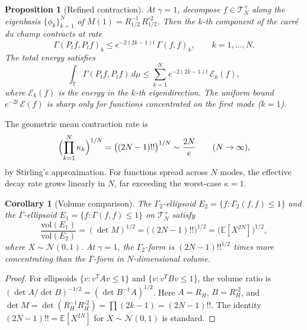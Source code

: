 \documentclass[11pt,a4paper]{article}
\theoremstyle{plain}
\newtheorem{proposition}[theorem]{Proposition}
\newtheorem{corollary}[theorem]{Corollary}
\theoremstyle{definition}
\theoremstyle{remark}
\newcommand{\E}{\mathbb{E}}
\newcommand{\T}{\mathbb{T}}
\begin{document}
\begin{proposition}[Refined contraction]\label{prop:refined}
At $\gamma = 1$, decompose $f \in \mathcal{T}_N^+$ along the
eigenbasis $\{\phi_k\}_{k=1}^N$ of $M(1) = R_{1/2}^{-1}\,R_{1/2}^{\circ 2}$.
Then the $k$-th component of the carr\'e du champ contracts at rate
\begin{equation}\label{eq:refined-contraction}
  \Gamma(P_t f, P_t f)_k \leq e^{-2(2k-1)t}\,\Gamma(f,f)_k,
  \qquad k = 1,\ldots,N.
\end{equation}
The total energy satisfies
\begin{equation}\label{eq:total-energy}
  \int_\T \Gamma(P_t f, P_t f)\,d\mu
  \leq \sum_{k=1}^N e^{-2(2k-1)t}\,\mathcal{E}_k(f),
\end{equation}
where $\mathcal{E}_k(f)$ is the energy in the $k$-th eigendirection.
The uniform bound $e^{-2t}\,\mathcal{E}(f)$ is sharp only for
functions concentrated on the first mode ($k=1$).
\end{proposition}

The geometric mean contraction rate is
\[
  \Bigl(\prod_{k=1}^N \kappa_k\Bigr)^{1/N}
  = \bigl((2N-1)!!\bigr)^{1/N} \sim \frac{2N}{e}
  \qquad (N \to \infty),
\]
by Stirling's approximation.
For functions spread across $N$ modes, the effective decay rate
grows linearly in $N$, far exceeding the worst-case $\kappa = 1$.

\begin{corollary}[Volume comparison]\label{cor:volume}
The $\Gamma_2$-ellipsoid
$E_2 = \{f : \Gamma_2(f,f) \leq 1\}$ and the $\Gamma$-ellipsoid
$E_1 = \{f : \Gamma(f,f) \leq 1\}$ on $\mathcal{T}_N^+$ satisfy
\begin{equation}\label{eq:volume-ratio}
  \frac{\mathrm{vol}(E_1)}{\mathrm{vol}(E_2)}
  = (\det M)^{1/2} = \bigl((2N-1)!!\bigr)^{1/2}
  = \bigl(\E[X^{2N}]\bigr)^{1/2},
\end{equation}
where $X \sim \mathcal{N}(0,1)$.
At $\gamma = 1$, the $\Gamma_2$-form is $(2N-1)!!^{1/2}$ times
more concentrating than the $\Gamma$-form in $N$-dimensional volume.
\end{corollary}

\begin{proof}
For ellipsoids $\{v : v^T A v \leq 1\}$ and $\{v : v^T B v \leq 1\}$,
the volume ratio is $(\det A / \det B)^{-1/2} = (\det B^{-1}A)^{1/2}$.
Here $A = R_H$, $B = R_H^{\circ 2}$, and $\det M = \det(R_H^{-1}R_H^{\circ 2})
= \prod(2k-1) = (2N-1)!!$.
The identity $(2N-1)!! = \E[X^{2N}]$ for $X \sim \mathcal{N}(0,1)$
is standard.
\end{proof}
\end{document}
